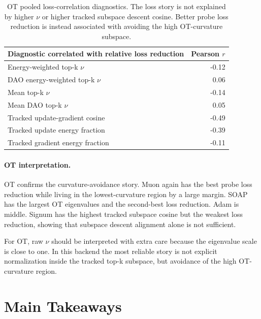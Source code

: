 \documentclass[11pt]{article}
\begin{document}
\begin{table}[htbp]
\centering
\small
\begin{tabular}{lr}
\toprule
Diagnostic correlated with relative loss reduction & Pearson $r$ \\
\midrule
Energy-weighted top-k $\nu$ & -0.12 \\
DAO energy-weighted top-k $\nu$ & 0.06 \\
Mean top-k $\nu$ & -0.14 \\
Mean DAO top-k $\nu$ & 0.05 \\
Tracked update-gradient cosine & -0.49 \\
Tracked update energy fraction & -0.39 \\
Tracked gradient energy fraction & -0.11 \\
\bottomrule
\end{tabular}
\caption{OT pooled loss-correlation diagnostics. The loss story is not explained by higher $\nu$ or higher tracked subspace descent cosine. Better probe loss reduction is instead associated with avoiding the high OT-curvature subspace.}
\label{tab:ot-correlations}
\end{table}

\paragraph{OT interpretation.}
OT confirms the curvature-avoidance story. Muon again has the best probe loss
reduction while living in the lowest-curvature region by a large margin. SOAP
has the largest OT eigenvalues and the second-best loss reduction. Adam is
middle. Signum has the highest tracked subspace cosine but the weakest loss
reduction, showing that subspace descent alignment alone is not sufficient.

For OT, raw $\nu$ should be interpreted with extra care because the eigenvalue
scale is close to one. In this backend the most reliable story is not explicit
normalization inside the tracked top-k subspace, but avoidance of the high
OT-curvature region.

\FloatBarrier

\section{Main Takeaways}
\end{document}
